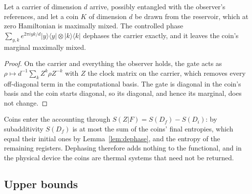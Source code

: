 \begin{lemma}\label{lem:dephase}
Let a carrier of dimension $d$ arrive, possibly entangled with the observer's references, and let a coin $K$ of dimension $d$ be drawn from the reservoir, which at zero Hamiltonian is maximally mixed. The controlled phase $\sum_{y,k}e^{2\pi iyk/d}|y\rangle\langle y|\otimes|k\rangle\langle k|$ dephases the carrier exactly, and it leaves the coin's marginal maximally mixed.
\end{lemma}
\begin{proof}
On the carrier and everything the observer holds, the gate acts as $\rho\mapsto d^{-1}\sum_k Z^k\rho Z^{-k}$ with $Z$ the clock matrix on the carrier, which removes every off-diagonal term in the computational basis. The gate is diagonal in the coin's basis and the coin starts diagonal, so its diagonal, and hence its marginal, does not change.
\end{proof}

Coins enter the accounting through $S(Z|F)=S(D_f)-S(D_i)$: by subadditivity $S(D_f)$ is at most the sum of the coins' final entropies, which equal their initial ones by Lemma~\ref{lem:dephase}, and the entropy of the remaining registers. Dephasing therefore adds nothing to the functional, and in the physical device the coins are thermal systems that need not be returned.

\subsection{Upper bounds}

